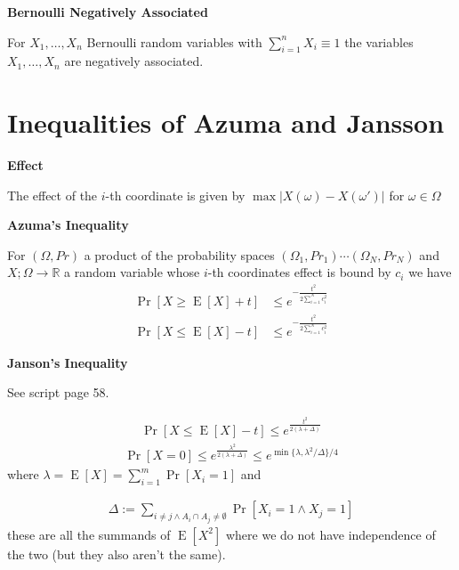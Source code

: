 \documentclass[25pt]{sciposter}
\newcommand{\R}{\mathbb{R}}
\newcommand{\E}{\operatorname{E}}
\newenvironment{method}[1]{\begin{mdframed}[backgroundcolor=blue!10,innertopmargin=15pt, innerbottommargin=15pt,nobreak=true]
		\textbf{#1 }
	}
	{ 
	\end{mdframed}
}
\newenvironment{defn}[1]{\begin{mdframed}[backgroundcolor=PineGreen!20,innertopmargin=15pt, innerbottommargin=15pt, nobreak=true]
		\textbf{#1 }
	}
	{ 
	\end{mdframed}
}
\begin{document}
\begin{multicols}{3}
\begin{method}{Bernoulli Negatively Associated}
	For $X_1, \ldots, X_n$ Bernoulli random variables with $\sum_{i=1}^{n} X_i \equiv 1$ the variables $X_1,\ldots, X_n$ are negatively associated.
\end{method}

	
	
		\section{Inequalities of Azuma and Jansson}
	
		\begin{defn}{Effect}
The effect of the $i$-th coordinate is given by $\max |X(\omega) - X(\omega')| $ for $\omega \in \Omega$
		\end{defn}
	
			\begin{method}{Azuma's Inequality}
				For $(\Omega, Pr)$ a product of the probability spaces $(\Omega_1, Pr_1) \cdots (\Omega_N, Pr_N)$ and $X;\Omega \to \R$ a random variable whose $i$-th coordinates effect is bound by $c_i$ we have
				\begin{align*}
					\Pr[X\geq \E[X] + t] &\leq e^{-\frac{t^2}{2\sum_{i=1}^{N} c_i ^2}}\\
					\Pr[X\leq \E[X] - t] &\leq e^{-\frac{t^2}{2\sum_{i=1}^{N} c_i ^2}}
				\end{align*}
			\end{method}	
				
			\begin{method}{Janson's Inequality}
See script page 58. 

\begin{align*}
	\Pr[X \leq \E[X] - t ] \leq e^{\frac{t^2}{2(\lambda + \Delta)}}
\end{align*}
\begin{align*}
	\Pr[X = 0 ] \leq e^{\frac{\lambda^2}{2(\lambda + \Delta)}} \leq e^{\min\{\lambda, \lambda^2 / \Delta\} / 4}
\end{align*}
where $\lambda = \E[X] = \sum_{i=1}^{m} \Pr[X_i = 1]$ and 

\begin{align*}
	\Delta := \sum_{i\neq j \land A_i \cap A_j \neq \emptyset} \Pr[X_i = 1 \land X_j = 1]
\end{align*}
these are all the summands of $\E[X^2]$ where we do not have independence of the two (but they also aren't the same).
			\end{method}
		

\end{multicols}
\end{document}
